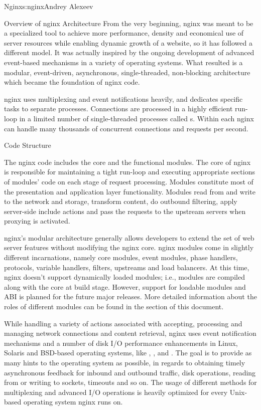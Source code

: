 \begin{aosachapter}{Nginx}{s:nginx}{Andrey Alexeev}
\begin{aosasect1}{Overview of nginx Architecture}
From the very beginning, nginx was meant to be a specialized tool to
achieve more performance, density and economical use of server
resources while enabling dynamic growth of a website, so it has
followed a different model. It was actually inspired by the ongoing
development of advanced event-based mechanisms in a variety of
operating systems. What resulted is a modular, event-driven,
asynchronous, single-threaded, non-blocking architecture which became
the foundation of nginx code.

nginx uses multiplexing and event notifications heavily, and dedicates
specific tasks to separate processes. Connections are processed in a
highly efficient run-loop in a limited number of single-threaded
processes called s. Within each  nginx can
handle many thousands of concurrent connections and requests per
second.

\begin{aosasect2}{Code Structure}

The nginx  code includes the core and the functional
modules. The core of nginx is responsible for maintaining a tight
run-loop and executing appropriate sections of modules' code on each
stage of request processing. Modules constitute most of the
presentation and application layer functionality. Modules read from
and write to the network and storage, transform content, do outbound
filtering, apply server-side include actions and pass the requests to
the upstream servers when proxying is activated.

nginx's modular architecture generally allows developers to extend the
set of web server features without modifying the nginx core. nginx
modules come in slightly different incarnations, namely core modules,
event modules, phase handlers, protocols, variable handlers, filters,
upstreams and load balancers. At this time, nginx doesn't support
dynamically loaded modules; i.e., modules are compiled along with the
core at build stage. However, support for loadable modules and ABI is
planned for the future major releases. More detailed information about
the roles of different modules can be found in the
 section of this document.

While handling a variety of actions associated with accepting,
processing and managing network connections and content retrieval,
nginx uses event notification mechanisms and a number of disk I/O
performance enhancements in Linux, Solaris and BSD-based operating
systems, like , , and . The
goal is to provide as many hints to the operating system as possible,
in regards to obtaining timely asynchronous feedback for inbound and
outbound traffic, disk operations, reading from or writing to sockets,
timeouts and so on. The usage of different methods for multiplexing
and advanced I/O operations is heavily optimized for every Unix-based
operating system nginx runs on.


\end{aosasect2}
\end{aosasect1}
\end{aosachapter}
